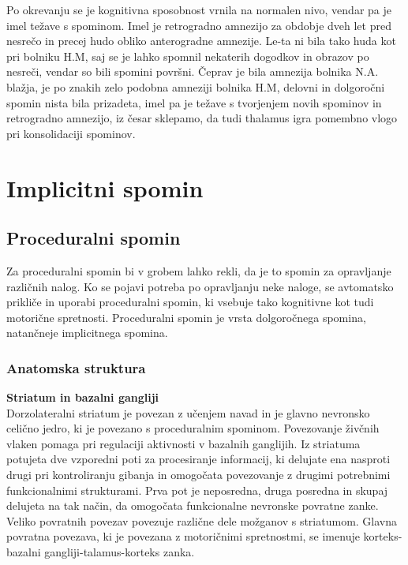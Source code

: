 \documentclass[10pt,a4paper]{article}
\begin{document}
Po okrevanju se je kognitivna sposobnost vrnila na normalen nivo, vendar pa je imel težave s spominom. Imel je retrogradno amnezijo za obdobje dveh let pred nesrečo in precej hudo obliko anterogradne amnezije. Le-ta ni bila tako huda kot pri bolniku H.M, saj se je lahko spomnil nekaterih dogodkov in obrazov po nesreči, vendar so bili spomini površni. Čeprav je bila amnezija bolnika N.A. blažja, je po znakih zelo podobna amneziji bolnika H.M, delovni in dolgoročni spomin nista bila prizadeta, imel pa je težave s tvorjenjem novih spominov in retrogradno amnezijo, iz česar sklepamo, da tudi thalamus igra pomembno vlogo pri konsolidaciji spominov.



\section{Implicitni spomin}
\subsection{Proceduralni spomin}
Za proceduralni spomin bi v grobem lahko rekli, da je to spomin za opravljanje različnih nalog. Ko se pojavi potreba po opravljanju neke naloge, se avtomatsko prikliče in uporabi proceduralni spomin, ki vsebuje tako kognitivne kot tudi motorične spretnosti. Proceduralni spomin je vrsta dolgoročnega spomina, natančneje implicitnega spomina.

\subsubsection{Anatomska struktura}
\textbf{Striatum in bazalni gangliji}\\
Dorzolateralni striatum je povezan z učenjem navad in je glavno nevronsko celično jedro, ki je povezano s proceduralnim spominom. Povezovanje živčnih vlaken pomaga pri regulaciji aktivnosti v bazalnih ganglijih. Iz striatuma potujeta dve vzporedni poti za procesiranje informacij, ki delujate ena nasproti drugi pri kontroliranju gibanja in omogočata povezovanje z drugimi potrebnimi funkcionalnimi strukturami. Prva pot je neposredna, druga posredna in skupaj delujeta na tak način, da omogočata funkcionalne nevronske povratne zanke. Veliko povratnih povezav povezuje različne dele možganov s striatumom. Glavna povratna povezava, ki je povezana z motoričnimi spretnostmi, se imenuje korteks-bazalni gangliji-talamus-korteks zanka.
\end{document}
